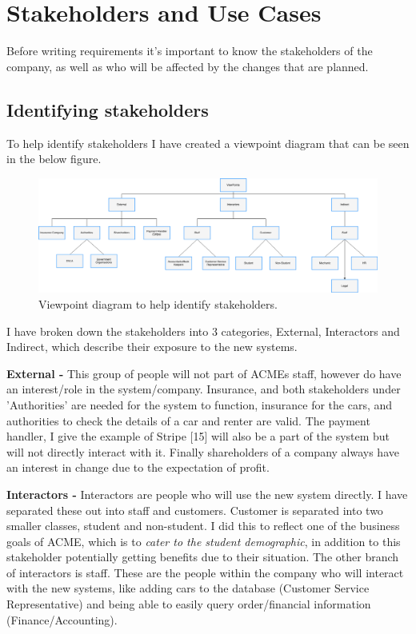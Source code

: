 \section{Stakeholders and Use Cases}
  Before writing requirements it's important to know the stakeholders of the company, as well as who will be affected by the changes that are planned.

  \subsection{Identifying stakeholders}
    To help identify stakeholders I have created a viewpoint diagram that can be seen in the below figure.
    \begin{figure}[H]
      \centering
      \includegraphics[width=12cm]{diagrams/viewpoints.drawio.png}
      \caption{Viewpoint diagram to help identify stakeholders.}
      \label{fig:viewpoint}
    \end{figure}

    I have broken down the stakeholders into 3 categories, External, Interactors and Indirect, which describe their
    exposure to the new systems.

    \vspace{0.2cm}

    \noindent\textbf{External -} This group of people will not part of ACMEs staff, however do have an interest/role in the system/company. Insurance, 
    and both stakeholders under 'Authorities' are needed for the system to function, insurance for the cars, and authorities to
    check the details of a car and renter are valid. The payment handler, I give the example of Stripe [15] will also be a part of the system
    but will not directly interact with it. Finally shareholders of a company always have an interest in change due to the expectation of profit.

    \vspace{0.2cm}

    \noindent\textbf{Interactors -} Interactors are people who will use the new system directly. I have separated these out into staff and customers.
    Customer is separated into two smaller classes, student and non-student. I did this to reflect one of the business goals of ACME, which is to \textit{
    cater to the student demographic}, in addition to this stakeholder potentially getting benefits due to their situation. The other branch of interactors
    is staff. These are the people within the company who will interact with the new systems, like adding cars to the database (Customer Service Representative)
    and being able to easily query order/financial information (Finance/Accounting).

